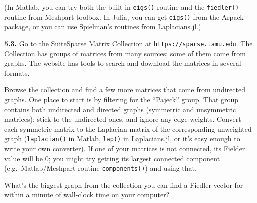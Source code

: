 \documentclass[11pt]{article}
\begin{document}
(In Matlab, you can try both the built-in {\tt eigs()} routine and 
the {\tt fiedler()} routine from Meshpart toolbox.
In Julia, you can get {\tt eigs()} from the Arpack package,
or you can use Spielman's routines from Laplacians.jl.)

\par\bigskip
{\bf 5.3.} 
Go to the SuiteSparse Matrix Collection at {\tt https://sparse.tamu.edu}.
The Collection has groups of matrices from many sources;
some of them come from graphs.
The website has tools to search and download the matrices in several formats.

Browse the collection and find a few more matrices 
that come from undirected graphs. 
One place to start is by filtering for the ``Pajeck'' group.
That group contains both undirected and directed graphs 
(symmetric and unsymmetric matrices); stick to the undirected ones,
and ignore any edge weights. 
Convert each symmetric matrix to the Laplacian matrix of the 
corresponding unweighted graph
({\tt laplacian()} in Matlab, {\tt lap()} in Laplacians.jl,
or it's easy enough to write your own converter).
If one of your matrices is not connected, its Fielder value will be 0;
you might try getting its largest connected component 
(e.g.\ Matlab/Meshpart routine {\tt components()}) and using that.

What's the biggest graph from the collection you can find a Fiedler vector 
for within a minute of wall-clock time on your computer?
\end{document}
